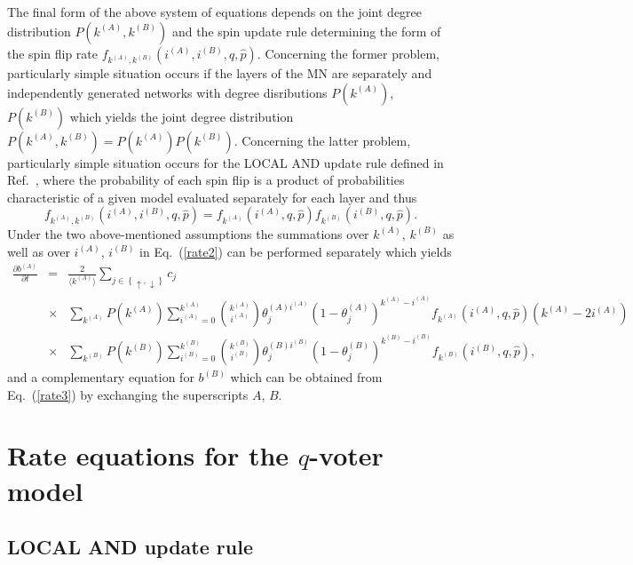 \documentclass[11pt]{article}
\begin{document}
The final form of the above system of equations depends on the joint degree distribution 
$P\left( k^{(A)}, k^{(B)}\right) $ and 
the spin update rule determining the form of the spin flip rate 
$f_{k^{(A)},k^{(B)}}\left( i^{(A)},i^{(B)},q,\hat{p}\right)$. 
Concerning the former problem, particularly simple situation occurs if the layers 
of the MN are separately and independently generated networks
with degree disributions $P\left( k^{(A)}\right)$, $P\left( k^{(B)}\right)$ which yields the joint degree distribution
$P\left( k^{(A)}, k^{(B)}\right)= P\left( k^{(A)}\right) P\left( k^{(B)}\right)$. 
Concerning the latter problem, particularly simple situation occurs for the LOCAL AND update rule
defined in Ref.\ \cite{Chmiel15}, where the probability of each spin flip is a product of probabilities characteristic of a given
model evaluated separately for each layer and thus
\begin{displaymath}
f_{k^{(A)},k^{(B)}}\left( i^{(A)},i^{(B)},q,\hat{p}\right)=
f_{k^{(A)}}\left( i^{(A)},q,\hat{p}\right) f_{k^{(B)}}\left( i^{(B)},q,\hat{p}\right).
\end{displaymath}
Under the two above-mentioned assumptions 
the summations over $k^{(A)}$, $k^{(B)}$ as well as over
$i^{(A)}$, $i^{(B)}$ in Eq.\ (\ref{rate2}) can be performed separately which yields
\begin{eqnarray}
\frac{\partial b^{(A)}}{\partial t} &=& \frac{2}{\langle k^{(A)}\rangle} \sum_{j\in \left\{ \uparrow,\downarrow\right\}} c_{j}
\nonumber\\
&\times&
\sum_{k^{(A)}} P\left( k^{(A)}\right)  
\sum_{i^{(A)}=0}^{k^{(A)}}
{k^{(A)} \choose i^{(A)} } \theta_{j}^{(A)i^{(A)}}\left( 1-\theta_{j}^{(A)}\right)^{k^{(A)}-i^{(A)}}
f_{k^{(A)}}\left( i^{(A)},q,\hat{p}\right) \left( k^{(A)}-2i^{(A)}\right) \nonumber\\
&\times& 
\sum_{k^{(B)}} P\left( k^{(B)}\right)  
\sum_{i^{(B)}=0}^{k^{(B)}}
{k^{(B)} \choose i^{(B)} } \theta_{j}^{(B)i^{(B)}}\left( 1-\theta_{j}^{(B)}\right)^{k^{(B)}-i^{(B)}}
f_{k^{(B)}}\left( i^{(B)},q,\hat{p}\right),
\label{rate3}
\end{eqnarray}
and a complementary equation for $b^{(B)}$ which can be obtained from Eq.\ (\ref{rate3}) by exchanging the
superscripts $A$, $B$.

\section{Rate equations for the $q$-voter model}

\subsection{LOCAL AND update rule}
\end{document}
